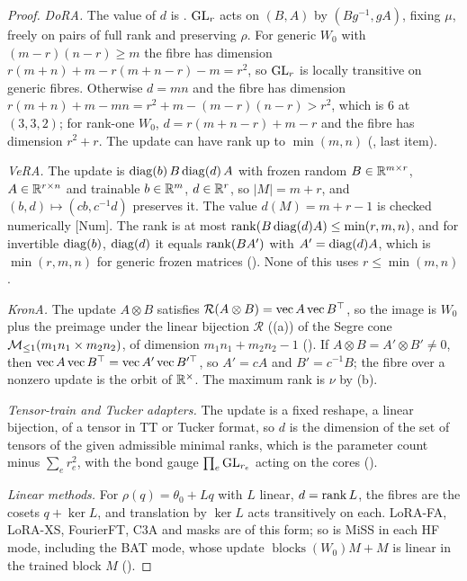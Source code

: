 \begin{proof}
\emph{DoRA.} The value of $d$ is . $\mathrm{GL}_r$ acts on $(B,A)$ by $(Bg^{-1},gA)$, fixing $\mu$, freely on
pairs of full rank and preserving $\rho$. For generic $W_0$ with $(m-r)(n-r)\ge m$ the fibre has dimension
$r(m+n)+m-r(m+n-r)-m=r^2$, so $\mathrm{GL}_r$ is locally transitive on generic fibres. Otherwise $d=mn$ and the fibre has dimension
$r(m+n)+m-mn=r^2+m-(m-r)(n-r)>r^2$, which is $6$ at $(3,3,2)$; for rank-one $W_0$, $d=r(m+n-r)+m-r$ and the fibre has dimension
$r^2+r$. The update can have rank up to $\min(m,n)$ (, last item).

\emph{VeRA.} The update is $\operatorname{diag}(b)\,B\operatorname{diag}(d)\,A$ with frozen random $B\in\mathbb{R}^{m\times r}$, $A\in\mathbb{R}^{r\times n}$ and trainable
$b\in\mathbb{R}^m$, $d\in\mathbb{R}^r$, so $\lvert M\rvert=m+r$, and $(b,d)\mapsto(cb,c^{-1}d)$ preserves it. The value $d(M)=m+r-1$ is
checked numerically [Num]. The rank is at most $\operatorname{rank}(B\operatorname{diag}(d)A)\le\min(r,m,n)$, and for invertible $\operatorname{diag}(b)$, $\operatorname{diag}(d)$ it
equals $\operatorname{rank}(BA')$ with $A'=\operatorname{diag}(d)A$, which is $\min(r,m,n)$ for generic frozen matrices (). None of this uses
$r\le\min(m,n)$.

\emph{KronA.} The update $A\otimes B$ satisfies $\mathcal R(A\otimes B)=\operatorname{vec} A\operatorname{vec} B^{\top}$, so the image is $W_0$ plus the
preimage under the linear bijection $\mathcal R$ ((a)) of the Segre cone $\mathcal{M}_{\le1}(m_1n_1\times m_2n_2)$, of
dimension $m_1n_1+m_2n_2-1$ (). If $A\otimes B=A'\otimes B'\ne0$, then $\operatorname{vec} A\operatorname{vec} B^{\top}=\operatorname{vec} A'\operatorname{vec} B'^{\top}$,
so $A'=cA$ and $B'=c^{-1}B$; the fibre over a nonzero update is the orbit of $\mathbb{R}^\times$. The maximum rank is $\nu$ by
(b).

\emph{Tensor-train and Tucker adapters.} The update is a fixed reshape, a linear bijection, of a tensor in TT or Tucker
format, so $d$ is the dimension of the set of tensors of the given admissible minimal ranks, which is the parameter count
minus $\sum_er_e^2$, with the bond gauge $\prod_e\mathrm{GL}_{r_e}$ acting on the cores ().

\emph{Linear methods.} For $\rho(q)=\theta_0+Lq$ with $L$ linear, $d=\operatorname{rank} L$, the fibres are the cosets $q+\ker L$, and
translation by $\ker L$ acts transitively on each. LoRA-FA, LoRA-XS, FourierFT, C3A and masks are of this form; so is MiSS
in each HF mode, including the BAT mode, whose update $\operatorname{blocks}(W_0)M+M$ is linear in the trained block $M$
().


\end{proof}
